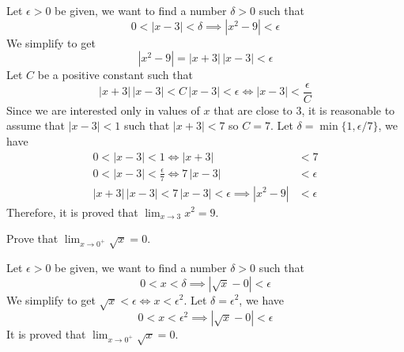 \begin{solution}
    Let \(\epsilon>0\) be given, we want to find a number \(\delta>0\) such
    that
    \[0<|x-3|<\delta\implies|x^2-9|<\epsilon\]
    We simplify to get \[|x^2-9|=|x+3|\,|x-3|<\epsilon\]
    Let \(C\) be a positive constant such that
    \[|x+3|\,|x-3|<C\,|x-3|<\epsilon \iff |x-3|<\frac{\epsilon}{C}\]
    Since we are interested only in values of \(x\) that are close to 3, it is
    reasonable to assume that \(|x-3|<1\) such that \(|x+3|<7\) so \(C=7\).
    Let \(\delta=\min\{1,\epsilon/7\}\), we have
    \begin{align*}
        0<|x-3|<1 \iff |x+3| &< 7 \\
        0<|x-3|<\frac{\epsilon}{7} \iff 7\,|x-3| &< \epsilon \\
        |x+3|\,|x-3|<7\,|x-3|<\epsilon\implies|x^2-9| &< \epsilon
    \end{align*}
    Therefore, it is proved that \(\lim_{x\to 3}x^2=9\).
\end{solution}
\begin{problem}
    Prove that \(\displaystyle{\lim_{x\to 0^+}\sqrt{x}=0}\).
\end{problem}
\begin{solution}
    Let \(\epsilon>0\) be given, we want to find a number \(\delta>0\) such
    that
    \[0<x<\delta\implies|\sqrt{x}-0|<\epsilon\]
    We simplify to get \(\sqrt{x}<\epsilon\iff x<\epsilon^2\).
    Let \(\delta=\epsilon^2\), we have
    \[0<x<\epsilon^2\implies|\sqrt{x}-0|<\epsilon\]
    It is proved that \(\lim_{x\to 0^+}\sqrt{x}=0\).
\end{solution}